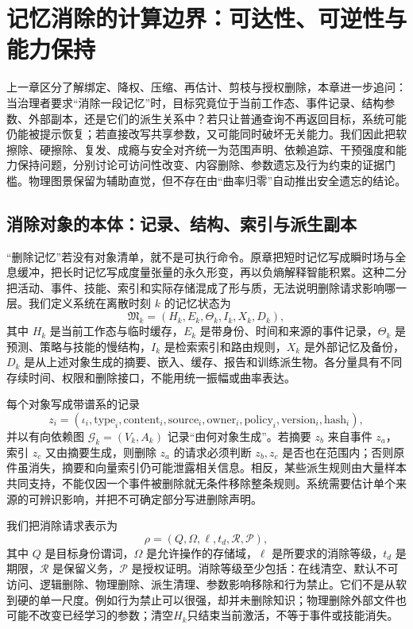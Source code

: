 \chapter{记忆消除的计算边界：可达性、可逆性与能力保持}
\label{chap:geometry_of_oblivion1}
上一章区分了解绑定、降权、压缩、再估计、剪枝与授权删除，本章进一步追问：当治理者要求“消除一段记忆”时，目标究竟位于当前工作态、事件记录、结构参数、外部副本，还是它们的派生关系中？若只让普通查询不再返回目标，系统可能仍能被提示恢复；若直接改写共享参数，又可能同时破坏无关能力。我们因此把软擦除、硬擦除、复发、成瘾与安全对齐统一为范围声明、依赖追踪、干预强度和能力保持问题，分别讨论可访问性改变、内容删除、参数遗忘及行为约束的证据门槛。物理图景保留为辅助直觉，但不存在由“曲率归零”自动推出安全遗忘的结论。

\section{消除对象的本体：记录、结构、索引与派生副本}
\label{sec:ontology_of_memory}
“删除记忆”若没有对象清单，就不是可执行命令。原章把短时记忆写成瞬时场与全息缓冲，把长时记忆写成度量张量的永久形变，再以负熵解释智能积累。这种二分把活动、事件、技能、索引和实际存储混成了形与质，无法说明删除请求影响哪一层。我们定义系统在离散时刻 $k$ 的记忆状态为
\[
\mathfrak M_k=(H_k,E_k,\Theta_k,I_k,X_k,D_k),
\]
其中 $H_k$ 是当前工作态与临时缓存，$E_k$ 是带身份、时间和来源的事件记录，$\Theta_k$ 是预测、策略与技能的慢结构，$I_k$ 是检索索引和路由规则，$X_k$ 是外部记忆及备份，$D_k$ 是从上述对象生成的摘要、嵌入、缓存、报告和训练派生物。各分量具有不同存续时间、权限和删除接口，不能用统一振幅或曲率表达。

每个对象写成带谱系的记录
\[
z_i=(\iota_i,\mathrm{type}_i,\mathrm{content}_i,\mathrm{source}_i,
\mathrm{owner}_i,\mathrm{policy}_i,\mathrm{version}_i,\mathrm{hash}_i),
\]
并以有向依赖图 $\mathcal G_k=(V_k,A_k)$ 记录“由何对象生成”。若摘要 $z_b$ 来自事件 $z_a$，索引 $z_c$ 又由摘要生成，则删除 $z_a$ 的请求必须判断 $z_b,z_c$ 是否也在范围内；否则原件虽消失，摘要和向量索引仍可能泄露相关信息。相反，某些派生规则由大量样本共同支持，不能仅因一个事件被删除就无条件移除整条规则。系统需要估计单个来源的可辨识影响，并把不可确定部分写进删除声明。

我们把消除请求表示为
\[
\rho=(Q,\Omega,\ell,t_d,\mathcal R,\mathcal P),
\]
其中 $Q$ 是目标身份谓词，$\Omega$ 是允许操作的存储域，$\ell$ 是所要求的消除等级，$t_d$ 是期限，$\mathcal R$ 是保留义务，$\mathcal P$ 是授权证明。消除等级至少包括：在线清空、默认不可访问、逻辑删除、物理删除、派生清理、参数影响移除和行为禁止。它们不是从软到硬的单一尺度。例如行为禁止可以很强，却并未删除知识；物理删除外部文件也可能不改变已经学习的参数；清空$H_k$只结束当前激活，不等于事件或技能消失。

